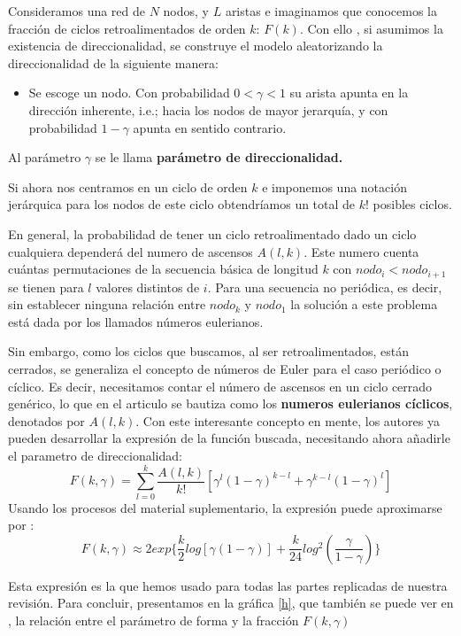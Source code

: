 \documentclass[1p]{elsarticle}
\begin{document}
Consideramos una red de $N$ nodos, y $L$ aristas e imaginamos que conocemos la fracción de ciclos retroalimentados de orden $k$: $F(k)$. Con ello , si asumimos la existencia de direccionalidad, se construye el modelo aleatorizando la direccionalidad de la siguiente manera: 
\begin{itemize}
	\item Se escoge un nodo. Con probabilidad $0<\gamma<1$ su arista apunta en la dirección inherente, i.e.; hacia los nodos de mayor jerarquía, y con probabilidad $1-\gamma$ apunta en sentido contrario.
\end{itemize}
Al parámetro $\gamma$ se le llama \textbf{parámetro de direccionalidad.}

Si ahora nos centramos en un ciclo de orden $k$ e imponemos una notación jerárquica para los nodos de este ciclo obtendríamos un total de $k!$ posibles ciclos. 

En general, la probabilidad de tener un ciclo retroalimentado dado un ciclo cualquiera dependerá del numero de ascensos $A(l,k)$.
Este numero cuenta cuántas permutaciones de la secuencia básica de longitud $k$ con $nodo_{i}<nodo_{i+1}$ se tienen para $l$ valores distintos de $i$. Para una secuencia no periódica, es decir, sin establecer ninguna relación entre $nodo_k$ y $nodo_1$
la solución a este problema está dada por los llamados números eulerianos.

 Sin embargo, como los ciclos que buscamos, al ser retroalimentados, están cerrados, se  generaliza el concepto de números de Euler para el caso periódico o cíclico. Es decir, necesitamos contar el número de ascensos en un ciclo cerrado genérico, lo que en el articulo se bautiza como los \textbf{numeros eulerianos cíclicos}, denotados por $A(l,k)$.
Con este interesante concepto en mente, los autores ya pueden desarrollar la expresión de la función buscada, necesitando ahora añadirle el parametro de direccionalidad:
$$F(k,\gamma)=\sum_{l=0}^{k}\frac{A(l,k)}{k!}[\gamma^l(1-\gamma)^{k-l}+\gamma^{k-l}(1-\gamma)^l]$$
Usando los procesos del material suplementario, la expresión puede aproximarse por :
$$F(k,\gamma)\approx 2exp\{\frac{k}{2}log[\gamma(1-\gamma)]+\frac{k}{24}log^2(\frac{\gamma}{1-\gamma})\}$$

Esta expresión es la que hemos usado para todas las partes replicadas de nuestra revisión.
Para concluir, presentamos en la gráfica \ref{h}, que también se puede ver en \cite{arti}, la relación entre el parámetro de forma y la fracción $F(k,\gamma)$
\end{document}
